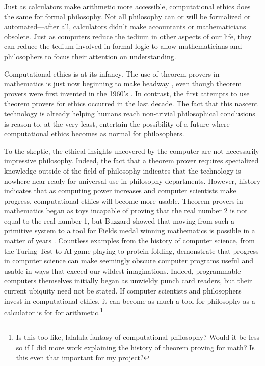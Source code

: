 \begin{isabellebody}
\begin{isamarkuptext}
Just as calculators make arithmetic more accessible, computational ethics does the same for formal philosophy. 
Not all philosophy can or will 
be formalized or automated—after all, calculators didn't make accountants or mathematicians obsolete. Just as computers 
reduce the tedium in other aspects of our life, they can reduce the tedium involved in formal logic to 
allow mathematicians and philosophers to focus their attention on understanding.%
\end{isamarkuptext}\isamarkuptrue%
%
\isadelimdocument
%
\endisadelimdocument
%
\isatagdocument
%
\isamarkuptrue%
%
\endisatagdocument
{\isafolddocument}%
%
\isadelimdocument
%
\endisadelimdocument
%
\begin{isamarkuptext}%
Computational ethics is at its infancy. The use of theorem provers in mathematics is just now beginning 
to make headway \cite{buzzardvideo}, even though theorem provers were first invented in the 1960's \cite{historyofITP}. In contrast, the first attempts to use theorem 
provers for ethics occurred in the last decade. The fact that this nascent technology is already 
helping humans reach non-trivial philosophical conclusions is reason to, at the very least, entertain 
the possibility of a future where computational ethics becomes as normal for philosophers.

To the skeptic, the ethical insights uncovered by the computer are not necessarily impressive 
philosophy. Indeed, the fact that a theorem prover requires specialized knowledge outside of the field 
of philosophy indicates that the technology is nowhere near ready for universal use in philosophy 
departments. However, history indicates that as computing power increases and computer scientists make 
progress, computational ethics will become more usable. Theorem provers in mathematics began as toys 
incapable of proving that the real number 2 is not equal to the real number 1, but Buzzard showed that 
moving from such a primitive system to a tool for Fields medal winning mathematics is possible in a 
matter of years \cite{buzzardvideo}. Countless examples from the history of computer science, from the Turing 
Test to AI game playing to protein folding, demonstrate that progress in computer science can make seemingly 
obscure computer programs useful and usable in ways that exceed our wildest imaginations. Indeed, 
programmable computers themselves initially began as unwieldy punch card readers, but their current ubiquity 
need not be stated. If computer scientists and philosophers invest in computational ethics, it can 
become as much a tool for philosophy as a calculator is for for arithmetic.\footnote{Is this too like, 
lalalala fantasy of computational philosophy? Would it be less so if I did more work explaining 
the history of theorem proving for math? Is this even that important for my project?}%
\end{isamarkuptext}\isamarkuptrue%
%
\isadelimtheory
%
\endisadelimtheory
%
\isatagtheory
%
\endisatagtheory
{\isafoldtheory}%
%
\isadelimtheory
%
\endisadelimtheory
%
\end{isabellebody}%
